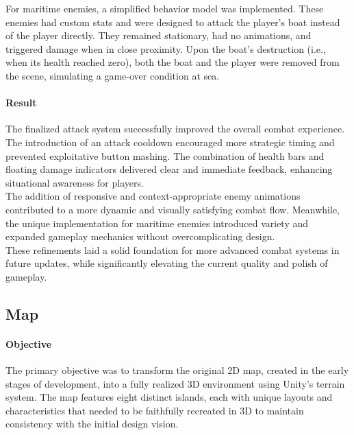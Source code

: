 \documentclass{article}
\begin{document}
For maritime enemies, a simplified behavior model was implemented. These enemies had custom stats and were designed to attack the player's boat instead of the player directly. They remained stationary, had no animations, and triggered damage when in close proximity. Upon the boat's destruction (i.e., when its health reached zero), both the boat and the player were removed from the scene, simulating a game-over condition at sea.

\paragraph{Result}\hfill

The finalized attack system successfully improved the overall combat experience. The introduction of an attack cooldown encouraged more strategic timing and prevented exploitative button mashing. The combination of health bars and floating damage indicators delivered clear and immediate feedback, enhancing situational awareness for players.\\

The addition of responsive and context-appropriate enemy animations contributed to a more dynamic and visually satisfying combat flow. Meanwhile, the unique implementation for maritime enemies introduced variety and expanded gameplay mechanics without overcomplicating design.\\

These refinements laid a solid foundation for more advanced combat systems in future updates, while significantly elevating the current quality and polish of gameplay.











\newpage
\subsection{Map}
\paragraph{Objective}\hfill

The primary objective was to transform the original 2D map, created in the early stages of development, into a fully realized 3D environment using Unity's terrain system. The map features eight distinct islands, each with unique layouts and characteristics that needed to be faithfully recreated in 3D to maintain consistency with the initial design vision.
\end{document}
